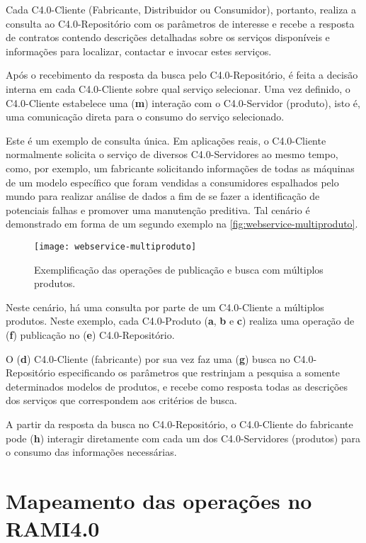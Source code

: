 Cada C4.0-Cliente (Fabricante, Distribuidor ou Consumidor), portanto, realiza a consulta ao C4.0-Repositório com os parâmetros de interesse e recebe a resposta de contratos contendo descrições detalhadas sobre os serviços disponíveis e informações para localizar, contactar e invocar estes serviços.

Após o recebimento da resposta da busca pelo C4.0-Repositório, é feita a decisão interna em cada C4.0-Cliente sobre qual serviço selecionar. Uma vez definido, o C4.0-Cliente estabelece uma (\textbf{m}) interação com o C4.0-Servidor (produto), isto é, uma comunicação direta para o consumo do serviço selecionado.

Este é um exemplo de consulta única. Em aplicações reais, o C4.0-Cliente normalmente solicita o serviço de diversos C4.0-Servidores ao mesmo tempo, como, por exemplo, um fabricante solicitando informações de todas as máquinas de um modelo específico que foram vendidas a consumidores espalhados pelo mundo para realizar análise de dados a fim de se fazer a identificação de potenciais falhas e promover uma manutenção preditiva. Tal cenário é demonstrado em forma de um segundo exemplo na \autoref{fig:webservice-multiproduto}.

\begin{figure}[t]
	\centering
	\texttt{[image: webservice-multiproduto]}
	\caption{Exemplificação das operações de publicação e busca com múltiplos produtos.}
	\label{fig:webservice-multiproduto}
\end{figure}

Neste cenário, há uma consulta por parte de um C4.0-Cliente a múltiplos produtos. Neste exemplo, cada C4.0-Produto (\textbf{a}, \textbf{b} e \textbf{c}) realiza uma operação de (\textbf{f}) publicação no (\textbf{e}) C4.0-Repositório.

O (\textbf{d}) C4.0-Cliente (fabricante) por sua vez faz uma (\textbf{g}) busca no C4.0-Repositório especificando os parâmetros que restrinjam a pesquisa a somente determinados modelos de produtos, e recebe como resposta todas as descrições dos serviços que correspondem aos critérios de busca.

A partir da resposta da busca no C4.0-Repositório, o C4.0-Cliente do fabricante pode (\textbf{h}) interagir diretamente com cada um dos C4.0-Servidores (produtos) para o consumo das informações necessárias.

\section{Mapeamento das operações no RAMI4.0}
\label{sec:mapeamento-das-operacoes}

